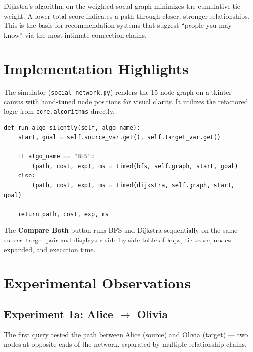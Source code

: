 \documentclass[12pt, a4paper, oneside]{report}
\theoremstyle{definition}
\begin{document}
Dijkstra's algorithm on the weighted social graph minimizes the cumulative tie weight. A lower total score indicates a path through closer, stronger relationships. This is the basis for recommendation systems that suggest ``people you may know'' via the most intimate connection chains.

\section{Implementation Highlights}

The simulator (\texttt{social\_network.py}) renders the 15-node graph on a tkinter canvas with hand-tuned node positions for visual clarity. It utilizes the refactored logic from \texttt{core.algorithms} directly.

\begin{lstlisting}[caption={BFS and Dijkstra path finding on social network (from case\_study\_2\_social/social\_network.py)}, label={lst:social_bfs}]
def run_algo_silently(self, algo_name):
    start, goal = self.source_var.get(), self.target_var.get()
    
    if algo_name == "BFS":
        (path, cost, exp), ms = timed(bfs, self.graph, start, goal)
    else:
        (path, cost, exp), ms = timed(dijkstra, self.graph, start, goal)
        
    return path, cost, exp, ms
\end{lstlisting}

The \textbf{Compare Both} button runs BFS and Dijkstra sequentially on the same source--target pair and displays a side-by-side table of hops, tie score, nodes expanded, and execution time.

\section{Experimental Observations}

\subsection{Experiment 1a: \texorpdfstring{Alice $\to$ Olivia}{Alice to Olivia}}

The first query tested the path between Alice (source) and Olivia (target) — two nodes at opposite ends of the network, separated by multiple relationship chains.
\end{document}
